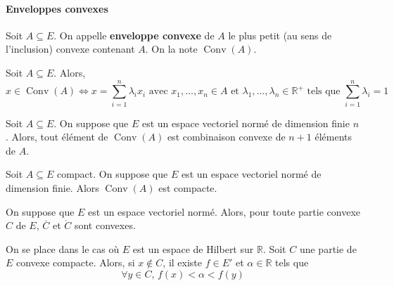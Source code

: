 	\paragraph{Enveloppes convexes}
	
	
	\begin{definition}
		Soit $A \subseteq E$. On appelle \textbf{enveloppe convexe} de $A$ le plus petit (au sens de l'inclusion) convexe contenant $A$. On la note $\operatorname{Conv}(A)$.
	\end{definition}
	
	\begin{proposition}
		Soit $A \subseteq E$. Alors,
		\[ x \in \operatorname{Conv}(A) \iff x = \sum_{i=1}^{n} \lambda_i x_i \text{ avec } x_1, \dots, x_n \in A \text{ et } \lambda_1, \dots, \lambda_n \in \mathbb{R}^+ \text{ tels que } \sum_{i=1}^n \lambda_i = 1 \]
	\end{proposition}
	
	
	\begin{theorem}[Carathéodory]
		Soit $A \subseteq E$. On suppose que $E$ est un espace vectoriel normé de dimension finie $n$. Alors, tout élément de $\operatorname{Conv}(A)$ est combinaison convexe de $n+1$ éléments de $A$.
	\end{theorem}
	
	\begin{application}
		Soit $A \subseteq E$ compact. On suppose que $E$ est un espace vectoriel normé de dimension finie. Alors $\operatorname{Conv}(A)$ est compacte.
	\end{application}
	
	\begin{proposition}
		On suppose que $E$ est un espace vectoriel normé. Alors, pour toute partie convexe $C$ de $E$, $\overline{C}$ et $\mathring{C}$ sont convexes.
	\end{proposition}
	
	
	\begin{theorem}
		On se place dans le cas où $E$ est un espace de Hilbert sur $\mathbb{R}$. Soit $C$ une partie de $E$ convexe compacte. Alors, si $x \notin C$, il existe $f \in E'$ et $\alpha \in \mathbb{R}$ tels que
		\[ \forall y \in C, \, f(x) < \alpha < f(y) \]
	\end{theorem}
	
	
